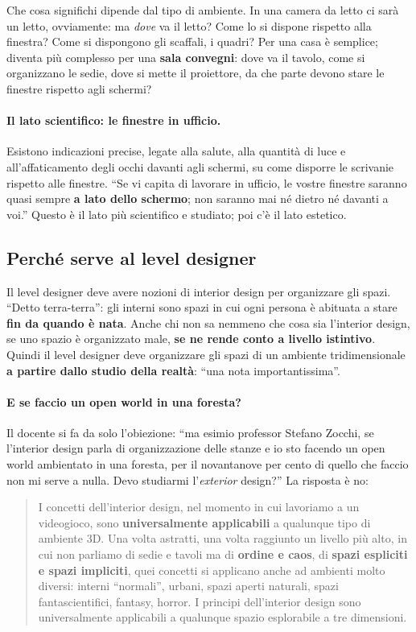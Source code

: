 Che cosa significhi dipende dal tipo di ambiente. In una camera da letto ci sarà un
letto, ovviamente: ma \emph{dove} va il letto? Come lo si dispone rispetto alla
finestra? Come si dispongono gli scaffali, i quadri? Per una casa è semplice; diventa
più complesso per una \textbf{sala convegni}: dove va il tavolo, come si organizzano le
sedie, dove si mette il proiettore, da che parte devono stare le finestre rispetto agli
schermi?

\paragraph{Il lato scientifico: le finestre in ufficio.} Esistono indicazioni precise,
legate alla salute, alla quantità di luce e all'affaticamento degli occhi davanti agli
schermi, su come disporre le scrivanie rispetto alle finestre. ``Se vi capita di
lavorare in ufficio, le vostre finestre saranno quasi sempre \textbf{a lato dello
schermo}; non saranno mai né dietro né davanti a voi.'' Questo è il lato più scientifico
e studiato; poi c'è il lato estetico.

\subsection{Perché serve al level designer}

Il level designer deve avere nozioni di interior design per organizzare gli spazi.
``Detto terra-terra'': gli interni sono spazi in cui ogni persona è abituata a stare
\textbf{fin da quando è nata}. Anche chi non sa nemmeno che cosa sia l'interior design,
se uno spazio è organizzato male, \textbf{se ne rende conto a livello istintivo}.
Quindi il level designer deve organizzare gli spazi di un ambiente tridimensionale
\textbf{a partire dallo studio della realtà}: ``una nota importantissima''.

\paragraph{E se faccio un open world in una foresta?} Il docente si fa da solo
l'obiezione: ``ma esimio professor Stefano Zocchi, se l'interior design parla di
organizzazione delle stanze e io sto facendo un open world ambientato in una foresta,
per il novantanove per cento di quello che faccio non mi serve a nulla. Devo studiarmi
l'\emph{exterior} design?'' La risposta è no:
\begin{quote}
I concetti dell'interior design, nel momento in cui lavoriamo a un videogioco, sono
\textbf{universalmente applicabili} a qualunque tipo di ambiente 3D. Una volta
astratti, una volta raggiunto un livello più alto, in cui non parliamo di sedie e
tavoli ma di \textbf{ordine e caos}, di \textbf{spazi espliciti e spazi impliciti}, quei
concetti si applicano anche ad ambienti molto diversi: interni ``normali'', urbani,
spazi aperti naturali, spazi fantascientifici, fantasy, horror. I principi
dell'interior design sono universalmente applicabili a qualunque spazio esplorabile a
tre dimensioni.
\end{quote}

